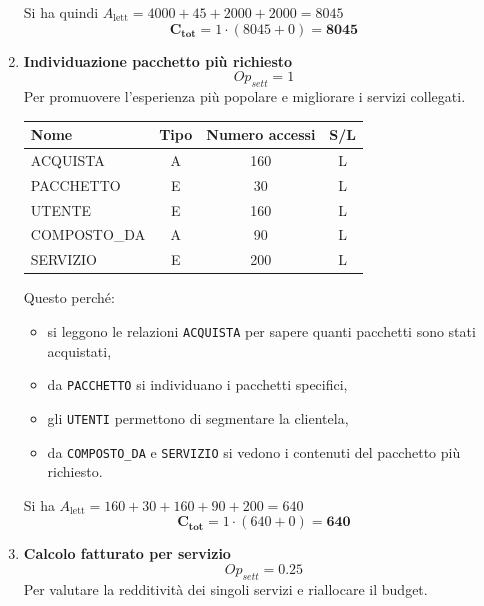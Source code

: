 \documentclass[a4paper,12pt]{report}
\begin{document}
\begin{enumerate}
	      Si ha quindi $A_{\text{lett}} = 4000 + 45 + 2000 + 2000 = 8045$
	      $$\mathbf{C_{tot}} = 1 \cdot (8045 + 0) = \mathbf{8045}$$


	\item {\large \textbf{Individuazione pacchetto più richiesto}} \label{op21}
	      $$
		      {Op}_{sett} = 1
	      $$
	      Per promuovere l'esperienza più popolare e migliorare i servizi collegati.

	      \begin{table}[H]
		      \centering
		      \small
		      \renewcommand{\arraystretch}{1.15}
		      \begin{tabularx}{0.8\textwidth}{|X|c|c|c|}
			      \hline
			      \rowcolor{gray!20}
			      \textbf{Nome} & \textbf{Tipo} & \textbf{Numero accessi} & \textbf{S/L} \\
			      \hline
			      ACQUISTA      & A             & 160                     & L            \\
			      PACCHETTO     & E             & 30                      & L            \\
			      UTENTE        & E             & 160                     & L            \\
			      COMPOSTO\_DA  & A             & 90                      & L            \\
			      SERVIZIO      & E             & 200                     & L            \\
			      \hline
		      \end{tabularx}
	      \end{table}

	      Questo perché:
	      \begin{itemize}
		      \item si leggono le relazioni \texttt{ACQUISTA} per sapere quanti pacchetti sono stati acquistati,
		      \item da \texttt{PACCHETTO} si individuano i pacchetti specifici,
		      \item gli \texttt{UTENTI} permettono di segmentare la clientela,
		      \item da \texttt{COMPOSTO\_DA} e \texttt{SERVIZIO} si vedono i contenuti del pacchetto più richiesto.
	      \end{itemize}

	      Si ha $A_{\text{lett}} = 160 + 30 + 160 + 90 + 200 = 640$
	      $$\mathbf{C_{tot}} = 1 \cdot (640 + 0) = \mathbf{640}$$


	\item {\large \textbf{Calcolo fatturato per servizio}} \label{op22}
	      $$
		      {Op}_{sett} = 0.25
	      $$
	      Per valutare la redditività dei singoli servizi e riallocare il budget.


\end{enumerate}
\end{document}
